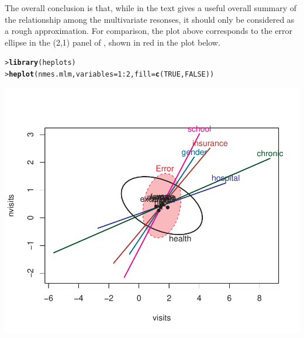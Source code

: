 \documentclass[10pt]{report}\usepackage[]{graphicx}\usepackage[]{color}
\makeatletter
\newcommand{\hlnum}[1]{\textcolor[rgb]{0.686,0.059,0.569}{#1}}%
\newcommand{\hlopt}[1]{\textcolor[rgb]{0,0,0}{#1}}%
\newcommand{\hlstd}[1]{\textcolor[rgb]{0.345,0.345,0.345}{#1}}%
\newcommand{\hlkwc}[1]{\textcolor[rgb]{0.333,0.667,0.333}{#1}}%
\newcommand{\hlkwd}[1]{\textcolor[rgb]{0.737,0.353,0.396}{\textbf{#1}}}%
\newenvironment{kframe}{%
 \def\at@end@of@kframe{}%
 \ifinner\ifhmode%
  \def\at@end@of@kframe{\end{minipage}}%
  \begin{minipage}{\columnwidth}%
 \fi\fi%
 \def\FrameCommand##1{\hskip\@totalleftmargin \hskip-\fboxsep
 \colorbox{shadecolor}{##1}\hskip-\fboxsep
     \hskip-\linewidth \hskip-\@totalleftmargin \hskip\columnwidth}%
 \MakeFramed {\advance\hsize-\width
   \@totalleftmargin\z@ \linewidth\hsize
   \@setminipage}}%
 {\par\unskip\endMakeFramed%
 \at@end@of@kframe}
\newenvironment{knitrout}{}{} %
\renewenvironment{knitrout}{\small\renewcommand{\baselinestretch}{.85}}{} %
\makeatother
\begin{document}
\begin{Exercises}
\begin{enumerate*}
\begin{ans}
\begin{knitrout}
\end{knitrout}
    The overall conclusion is that, while  in the text gives a useful
    overall summary of the relationship among the multivariate resonses, it should only be
    considered as a rough approximation.
    For comparison, the plot above corresponds to the error ellipse in the (2,1) panel of
    , shown in red in the plot below.
\begin{knitrout}\footnotesize
{}\color{fgcolor}\begin{kframe}
\begin{alltt}
\hlstd{> }\hlkwd{library}\hlstd{(heplots)}
\hlstd{> }\hlkwd{heplot}\hlstd{(nmes.mlm,} \hlkwc{variables}\hlstd{=}\hlnum{1}\hlopt{:}\hlnum{2}\hlstd{,} \hlkwc{fill}\hlstd{=}\hlkwd{c}\hlstd{(}\hlnum{TRUE}\hlstd{,} \hlnum{FALSE}\hlstd{))}
\end{alltt}
\end{kframe}

\centerline{\includegraphics[width=.5\textwidth]{soln/fig/ex11_8c2-1} }



\end{knitrout}

     \end{ans}
     

  \end{enumerate*}

\end{Exercises}

\clearpage
{}
{\itemsep -2pt

}

\printindex
\end{document}
